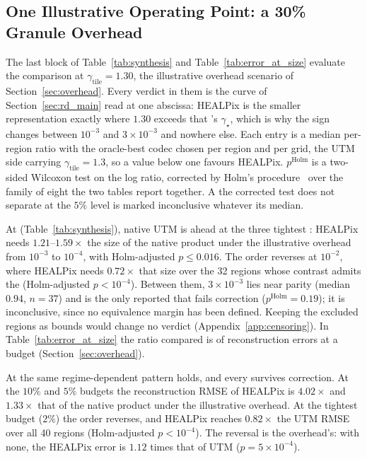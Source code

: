 \subsection{One Illustrative Operating Point: a 30\% Granule Overhead}
\label{sec:rd_illustrative}

The last block of Table~\ref{tab:synthesis} and Table~\ref{tab:error_at_size}
evaluate the comparison at $\gamma_{\mathrm{tile}}=1.30$, the
illustrative overhead scenario of Section~\ref{sec:overhead}. Every
verdict in them is the curve of Section~\ref{sec:rd_main} read at one
abscissa: HEALPix is the smaller representation exactly where $1.30$
exceeds that 's $\gamma_\star$, which is why the sign changes
between $10^{-3}$ and $3\times10^{-3}$ and nowhere else. Each entry is a median per-region ratio with the oracle-best codec
chosen per region and per grid, the UTM side
carrying $\gamma_{\mathrm{tile}}=1.3$, so a value below one favours
HEALPix.
$p^{\mathrm{Holm}}$ is a two-sided Wilcoxon test on the log ratio,
corrected by Holm's procedure~\cite{holm1979simple} over the family of eight  the two tables report
together. A  the corrected test does not separate at the $5\%$
level is marked inconclusive whatever its median.

At  (Table~\ref{tab:synthesis}), native UTM is ahead at
the three tightest : HEALPix needs $1.21$--$1.59\times$ the size of
the native product under the illustrative overhead from $10^{-3}$ to
$10^{-4}$, with Holm-adjusted $p\le0.016$. The order reverses at
$10^{-2}$, where HEALPix needs $0.72\times$ that size over the 32 regions
whose contrast admits the  (Holm-adjusted $p<10^{-4}$). Between
them, $3\times10^{-3}$ lies near parity (median $0.94$, $n=37$) and is the
only reported  that fails correction ($p^{\mathrm{Holm}}=0.19$); it
is inconclusive, since no equivalence margin has been defined. Keeping
the excluded regions as bounds would change no verdict
(Appendix~\ref{app:censoring}). In
Table~\ref{tab:error_at_size} the ratio compared is of reconstruction
errors at a budget (Section~\ref{sec:overhead}).



At  the same regime-dependent pattern holds, and every
 survives correction. At the $10\%$ and $5\%$ budgets the
reconstruction RMSE of HEALPix is $4.02\times$ and $1.33\times$ that of
the native product under the illustrative overhead. At the tightest
budget ($2\%$) the order reverses, and HEALPix reaches $0.82\times$ the
UTM RMSE over all 40 regions (Holm-adjusted $p<10^{-4}$). The reversal
is the overhead's: with none, the HEALPix error is $1.12$ times that of
UTM ($p=5\times10^{-4}$).

